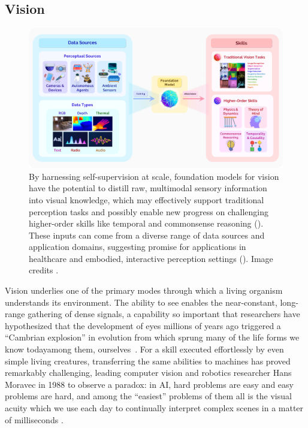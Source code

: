 \newsection
\subsection{Vision}
\label{sec:vision}

\begin{figure}[!ht]
\centering
\includegraphics[width=\linewidth]{capabilities/figures/Vision.png}
\caption{\label{fig:vision}
By harnessing self-supervision at scale, foundation models for vision have the potential to distill raw, multimodal sensory information into visual knowledge, which may effectively support traditional perception tasks and possibly enable new progress on challenging higher-order skills like temporal and commonsense reasoning (). These  inputs can come from a diverse range of data sources and application domains, suggesting promise for applications in healthcare and embodied, interactive perception settings (). Image credits \cite{zamir2018taskonomy, haque2020illuminating}.
}
\end{figure}

Vision underlies one of the primary modes through which a living organism understands its environment. 
The ability to see enables the near-constant, long-range gathering of dense signals, a capability so important that researchers have hypothesized that the development of eyes millions of years ago triggered a ``Cambrian explosion'' in evolution from which sprung many of the life forms we know today\dash{}among them, ourselves~\cite{parker2003blink}. 
For a skill executed effortlessly by even simple living creatures, transferring the same abilities to machines has proved remarkably challenging, leading computer vision and robotics researcher Hans Moravec in 1988 to observe a paradox: in AI, hard problems are easy and easy problems are hard, and among the ``easiest'' problems of them all is the visual acuity which we use each day to continually interpret complex scenes in a matter of milliseconds \cite{moravec1988mind,Thorpe1996,feifei2007we}.


